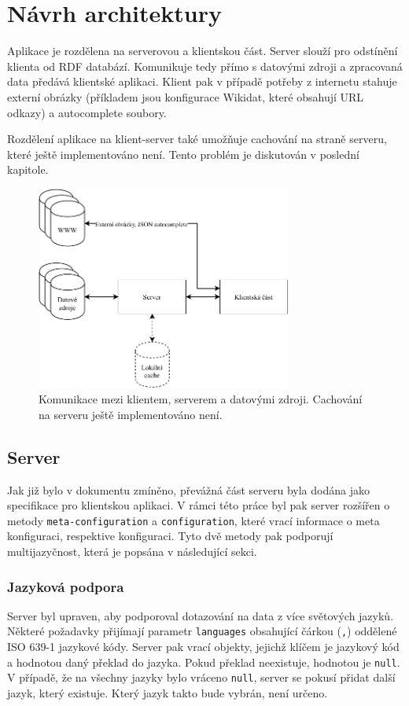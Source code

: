 \chapter{Návrh architektury}

Aplikace je rozdělena na serverovou a klientskou část. Server slouží pro odstínění klienta od RDF databází. Komunikuje tedy přímo s datovými zdroji a zpracovaná data předává klientské aplikaci. Klient pak v případě potřeby z internetu stahuje externí obrázky (příkladem jsou konfigurace Wikidat, které obsahují URL odkazy) a autocomplete soubory.

Rozdělení aplikace na klient-server také umožňuje cachování na straně serveru, které ještě implementováno není. Tento problém je diskutován v poslední kapitole.

\begin{figure}[h]
    \centering
    \includegraphics[width=0.75\textwidth]{media/communication.pdf}
    \caption{Komunikace mezi klientem, serverem a datovými zdroji. Cachování na serveru ještě implementováno není.}
\end{figure}

\section{Server}
Jak již bylo v dokumentu zmíněno, převážná část serveru byla dodána jako specifikace pro klientskou aplikaci. V rámci této práce byl pak server rozšířen o metody \texttt{meta-configuration} a \texttt{configuration}, které vrací informace o meta konfiguraci, respektive konfiguraci. Tyto dvě metody pak podporují multijazyčnost, která je popsána v následující sekci.

\subsection{Jazyková podpora} \label{jazykova-podpora}
Server byl upraven, aby podporoval dotazování na data z více světových jazyků. Některé požadavky přijímají parametr \texttt{languages} obsahující čárkou (\texttt{,}) oddělené ISO 639-1 jazykové kódy. Server pak vrací objekty, jejichž klíčem je jazykový kód a hodnotou daný překlad do jazyka. Pokud překlad neexistuje, hodnotou je \texttt{null}. V případě, že na všechny jazyky bylo vráceno \texttt{null}, server se pokusí přidat další jazyk, který existuje. Který jazyk takto bude vybrán, není určeno.

